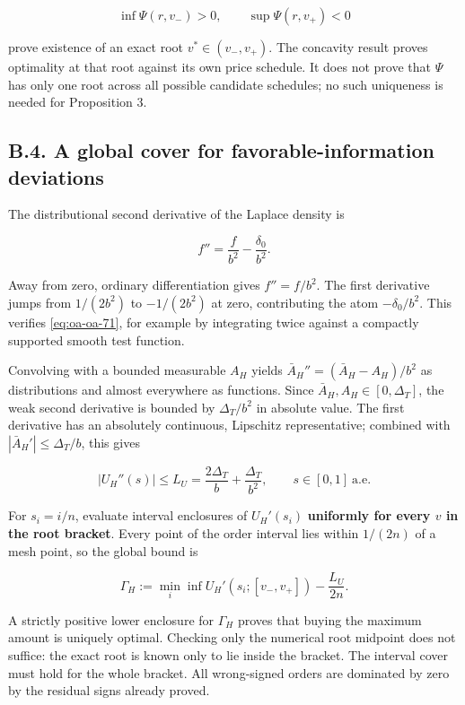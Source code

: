 \documentclass[
  11pt,
]{article}
\begin{document}
\[
\inf\Psi(r,v_-)>0,\qquad \sup\Psi(r,v_+)<0
\tag{OA.70}\label{eq:oa-oa-70}
\]

prove existence of an exact root \(v^*\in(v_-,v_+)\). The concavity
result proves optimality at that root against its own price schedule. It
does not prove that \(\Psi\) has only one root across all possible
candidate schedules; no such uniqueness is needed for Proposition 3.

\subsection{B.4. A global cover for favorable-information
deviations}\label{oa-b-cover}

The distributional second derivative of the Laplace density is

\[
f''=\frac{f}{b^2}-\frac{\delta_0}{b^2}.
\tag{OA.71}\label{eq:oa-oa-71}
\]

Away from zero, ordinary differentiation gives \(f''=f/b^2\). The first
derivative jumps from \(1/(2b^2)\) to \(-1/(2b^2)\) at zero,
contributing the atom \(-\delta_0/b^2\). This verifies
\eqref{eq:oa-oa-71}, for example by integrating twice against a
compactly supported smooth test function.

Convolving with a bounded measurable \(A_H\) yields
\(\bar A_H''=(\bar A_H-A_H)/b^2\) as distributions and almost everywhere as
functions. Since \(\bar A_H,A_H\in[0,\Delta_T]\), the weak second derivative
is bounded by \(\Delta_T/b^2\) in absolute value. The first derivative
has an absolutely continuous, Lipschitz representative; combined with
\(|\bar A_H'|\le\Delta_T/b\), this gives

\[
|U_H''(s)|\le L_U=\frac{2\Delta_T}{b}+\frac{\Delta_T}{b^2},\qquad s\in[0,1]\ \text{a.e.}
\tag{OA.72}\label{eq:oa-oa-72}
\]

For \(s_i=i/n\), evaluate interval enclosures of \(U_H'(s_i)\)
\textbf{uniformly for every \(v\) in the root bracket}. Every point of
the order interval lies within \(1/(2n)\) of a mesh point, so the global
bound is

\[
\Gamma_H:=\min_i\inf U_H'(s_i;[v_-,v_+])-\frac{L_U}{2n}.
\tag{OA.73}\label{eq:oa-oa-73}
\]

A strictly positive lower enclosure for \(\Gamma_H\) proves that buying
the maximum amount is uniquely optimal. Checking only the numerical root
midpoint does not suffice: the exact root is known only to lie inside
the bracket. The interval cover must hold for the whole bracket. All
wrong-signed orders are dominated by zero by the residual signs already
proved.
\end{document}
